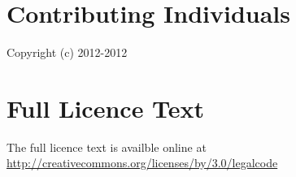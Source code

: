 \documentclass[a4paper,10pt,twoside]{book}
\begin{document}
\newpage
\section{Contributing Individuals}

Copyright (c) 2012-2012

\noindent


\section{Full Licence Text}

The full licence text is availble online at 
\url{http://creativecommons.org/licenses/by/3.0/legalcode}





\ifx\wholebook\relax\else
   
   
\end{document}
